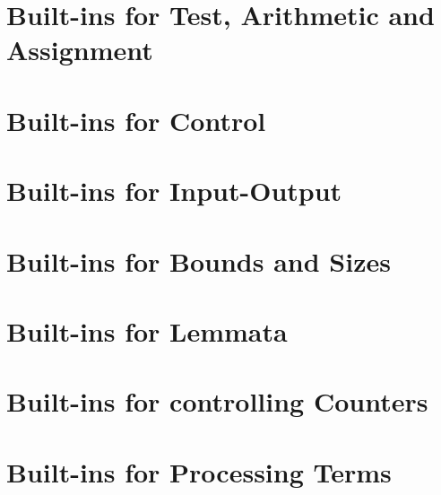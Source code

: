 %

\section{Built-ins for Test, Arithmetic and Assignment}














\section{Built-ins for Control}







\section{Built-ins for Input-Output}





\section{Built-ins for Bounds and Sizes}





\section{Built-ins for Lemmata}\label{sec:built-ins-lemmata}



%




\section{Built-ins for controlling Counters}




\section{Built-ins for Processing Terms}


